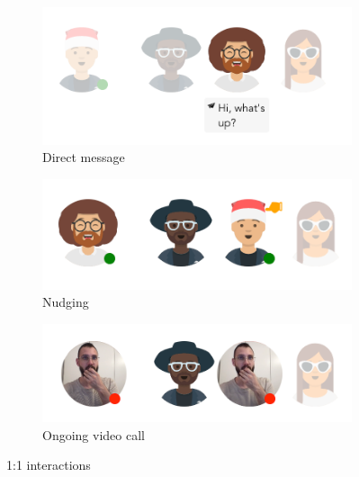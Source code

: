 \begin{figure}[h]
    \centering
    \begin{subfigure}{.3\textwidth}
        \centering
        \includegraphics[width=.9\linewidth]{./images/DM.png}
        \caption{Direct message }
        \label{fig:dm}
    \end{subfigure}%
    \begin{subfigure}{.3\textwidth}
        \centering
        \includegraphics[width=.9\linewidth]{./images/nudging.png}
        \caption{Nudging }
        \label{fig:nudging}
    \end{subfigure}
    \begin{subfigure}{.3\textwidth}
        \centering
        \includegraphics[width=.9\linewidth]{./images/call.png}
        \caption{Ongoing video call }
        \label{fig:call}
    \end{subfigure}
    \caption{1:1 interactions}
    \label{fig:interaction_results}
\end{figure}